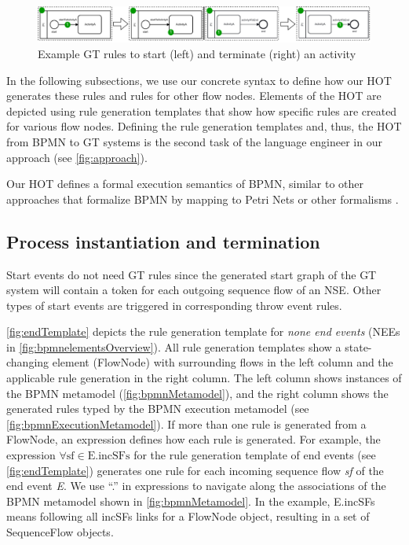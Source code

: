 \documentclass{lmcs} %
\begin{document}
\begin{figure}[ht]
    \centering
  \includegraphics[width=1\textwidth]{images/rule_concrete.pdf}
  \caption{Example GT rules to start (left) and terminate (right) an activity}
  \label{fig:gtRuleConcrete}
\end{figure}

In the following subsections, we use our concrete syntax to define how our HOT generates these rules and rules for other flow nodes.
Elements of the HOT are depicted using rule generation templates that show how specific rules are created for various flow nodes.
Defining the rule generation templates and, thus, the HOT from BPMN to GT systems is the second task of the language engineer in our approach (see \autoref{fig:approach}).

Our HOT defines a formal execution semantics of BPMN, similar to other approaches that formalize BPMN by mapping to Petri Nets or other formalisms \cite{dijkmanSemanticsAnalysisBusiness2008}.

\subsection{Process instantiation and termination} \label{subsec:instAndTermination}

Start events do not need GT rules since the generated start graph of the GT system will contain a token for each outgoing sequence flow of an NSE.
Other types of start events are triggered in corresponding throw event rules.

\autoref{fig:endTemplate} depicts the rule generation template for \textit{none end events} (\textsf{NEE}s in \autoref{fig:bpmnelementsOverview}).
All rule generation templates show a state-changing element (\textsf{FlowNode}) with surrounding flows in the left column and the applicable rule generation in the right column.
The left column shows instances of the BPMN metamodel (\autoref{fig:bpmnMetamodel}), and the right column shows the generated rules typed by the BPMN execution metamodel (see \autoref{fig:bpmnExecutionMetamodel}).
If more than one rule is generated from a \textsf{FlowNode}, an expression defines how each rule is generated.
For example, the expression $\forall \text{sf} \in \text{E.incSFs}$ for the rule generation template of end events (see \autoref{fig:endTemplate}) generates one rule for each incoming sequence flow \textit{sf} of the end event \textit{E}.
We use ``.'' in expressions to navigate along the associations of the BPMN metamodel shown in \autoref{fig:bpmnMetamodel}.
In the example, \textsf{E.incSFs} means following all \textsf{incSFs} links for a \textsf{FlowNode} object, resulting in a set of \textsf{SequenceFlow} objects.
\end{document}
